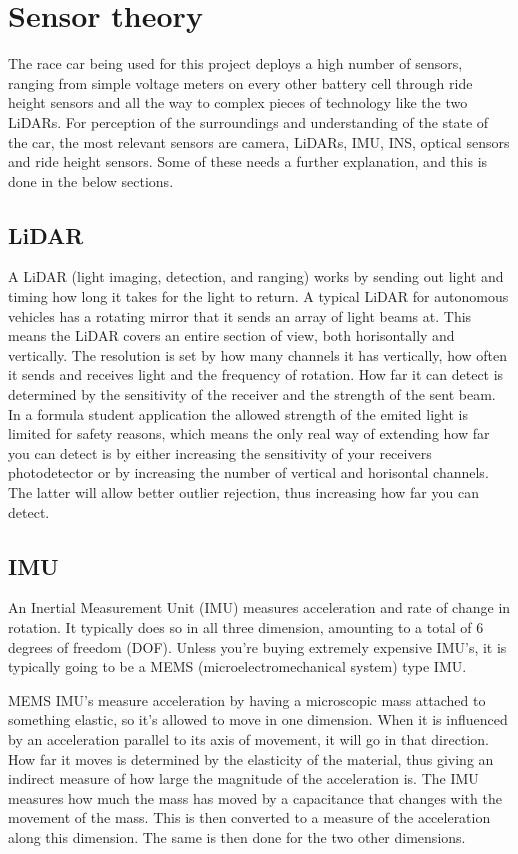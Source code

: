 \section{Sensor theory}
The race car being used for this project deploys a high number of sensors, ranging from simple voltage meters on every other battery cell through ride height sensors and all the way to complex pieces of technology like the two LiDARs. For perception of the surroundings and understanding of the state of the car, the most relevant sensors are camera, LiDARs, IMU, INS, optical sensors and ride height sensors. Some of these needs a further explanation, and this is done in the below sections.

\subsection{LiDAR}
A LiDAR (light imaging, detection, and ranging) works by sending out light and timing how long it takes for the light to return. A typical LiDAR for autonomous vehicles has a rotating mirror that it sends an array of light beams at. This means the LiDAR covers an entire section of view, both horisontally and vertically. The resolution is set by how many channels it has vertically, how often it sends and receives light and the frequency of rotation. How far it can detect is determined by the sensitivity of the receiver and the strength of the sent beam. In a formula student application the allowed strength of the emited light is limited for safety reasons, which means the only real way of extending how far you can detect is by either increasing the sensitivity of your receivers photodetector or by increasing the number of vertical and horisontal channels. The latter will allow better outlier rejection, thus increasing how far you can detect. 

\subsection{IMU}
An Inertial Measurement Unit (IMU) measures acceleration and rate of change in rotation. It typically does so in all three dimension, amounting to a total of 6 degrees of freedom (DOF). Unless you're buying extremely expensive IMU's, it is typically going to be a MEMS (microelectromechanical system) type IMU. 

MEMS IMU's measure acceleration by having a microscopic mass attached to something elastic, so it's allowed to move in one dimension. When it is influenced by an acceleration parallel to its axis of movement, it will go in that direction. How far it moves is determined by the elasticity of the material, thus giving an indirect measure of how large the magnitude of the acceleration is. The IMU measures how much the mass has moved by a capacitance that changes with the movement of the mass. This is then converted to a measure of the acceleration along this dimension. The same is then done for the two other dimensions. 

